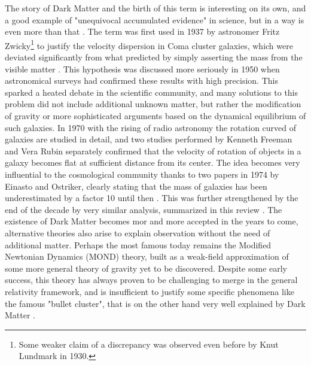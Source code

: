 The story of Dark Matter and the birth of this term is interesting on its own, and a good example of "unequivocal accumulated evidence" in science, but in a way is even more than that \cite{hooper, deSwart:2017heh}. The term was first used in 1937 by astronomer Fritz Zwicky\footnote{Some weaker claim of a discrepancy was observed even before by Knut Lundmark in 1930.} to justify the velocity dispersion in Coma cluster galaxies, which were deviated significantly from what predicted by simply asserting the mass from the visible matter \cite{1933AcHPh...6..110Z}. This hypothesis was discussed more seriously in 1950 when astronomical surveys had confirmed these results with high precision. This sparked a heated debate in the scientific community, and many solutions to this problem did not include additional unknown matter, but rather the modification of gravity or more sophisticated arguments based on the dynamical equilibrium of such galaxies. In 1970 with the rising of radio astronomy the rotation curved of galaxies are studied in detail, and two studies performed by Kenneth Freeman and Vera Rubin separately confirmed that the velocity of rotation of objects in a galaxy becomes flat at sufficient distance from its center. The idea becomes very influential to the cosmological community thanks to two papers in 1974 by Einasto and Ostriker, clearly stating that the mass of galaxies has been underestimated by a factor 10 until then \cite{EINASTO1974,1974ApJ...193L...1O}. This was further strengthened by the end of the decade by very similar analysis, summarized in this review \cite{annurev.aa.17.090179.001031}. The existence of Dark Matter becomes mor and more accepted in the years to come, alternative theories also arise to explain observation without the need of additional matter. Perhaps the most famous today remains the Modified Newtonian Dynamics (MOND) theory, built as a weak-field approximation of some more general theory of gravity yet to be discovered. Despite some early success, this theory has always proven to be challenging to merge in the general relativity framework, and is insufficient to justify some specific phenomena like the famous "bullet cluster", that is on the other hand very well explained by Dark Matter \cite{Clowe_2006}.

